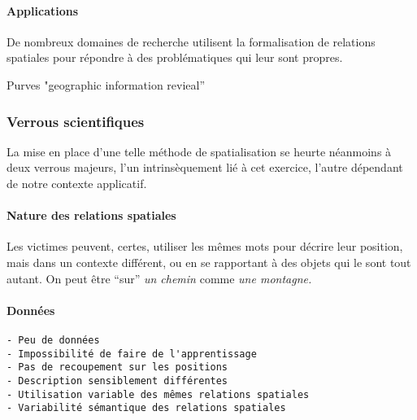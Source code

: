 \paragraph{Applications}


De nombreux domaines de recherche utilisent la formalisation de
relations spatiales pour répondre à des problématiques qui leur sont
propres.

\autocite{Xu2007a}
\autocite{Xu2007}
\autocite{Xu2006}
\autocite{Wolter2018}
\autocite{Dittrich2015}
\autocite{Vanegas2011}
\autocite{Du2016}
\autocite{Hornsby2009}
\autocite{Mathet2000}
\autocite{Hudelot2008a}
\autocite{Bloch1996}
\autocite{Hudelot2008}
\autocite{Levit2007}
\autocite{Evans2008}
\autocite{Takemura2012}
\autocite{Shariff1998}
\autocite{Skubic2004}
\autocite{Hall2015}
\autocite{Leopold2015}
\autocite{Denis1997}


Purves "geographic information revieal''


\subsubsection{Verrous scientifiques}

La mise en place d'une telle méthode de spatialisation se heurte
néanmoins à deux verrous majeurs, l'un intrinsèquement lié à cet
exercice, l'autre dépendant de notre contexte applicatif.

\paragraph{Nature des relations spatiales}

Les victimes peuvent, certes, utiliser les mêmes mots pour décrire
leur position, mais dans un contexte différent, ou en se rapportant à
des objets qui le sont tout autant. On peut être \enquote{sur}
\emph{un chemin} comme \emph{une montagne.}

\paragraph{Données}

\begin{verbatim}
- Peu de données
- Impossibilité de faire de l'apprentissage
- Pas de recoupement sur les positions
- Description sensiblement différentes
- Utilisation variable des mêmes relations spatiales
- Variabilité sémantique des relations spatiales
\end{verbatim}

